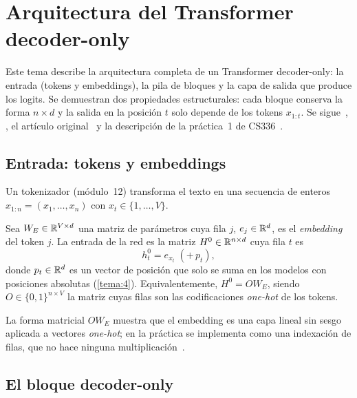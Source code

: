\chapter{Arquitectura del Transformer decoder-only}
\label{tema:1}

Este tema describe la arquitectura completa de un Transformer decoder-only: la entrada (tokens y embeddings), la pila de bloques y la capa de salida que produce los logits. Se demuestran dos propiedades estructurales: cada bloque conserva la forma $n\times d$ y la salida en la posición $t$ solo depende de los tokens $x_{1:t}$. Se sigue~\cite[§7.2--§7.5]{jm3}, \cite[§12.1.7 y §12.3.1]{bishopdl}, el artículo original~\cite[§3]{vaswani} y la descripción de la práctica~1 de CS336~\cite[§3.1 y §3.4]{cs336}.

\section{Entrada: tokens y embeddings}

Un tokenizador (módulo~12) transforma el texto en una secuencia de enteros $x_{1:n}=(x_1,\dots,x_n)$ con $x_t\in\{1,\dots,V\}$.

\begin{definicion}\label{def:embedding}
Sea $W_E\in\mathbb{R}^{V\times d}$ una matriz de parámetros cuya fila $j$, $e_j\in\mathbb{R}^{d}$, es el \emph{embedding} del token $j$. La entrada de la red es la matriz $H^{0}\in\mathbb{R}^{n\times d}$ cuya fila $t$ es
\[
h^{0}_t=e_{x_t}\;(+\,p_t),
\]
donde $p_t\in\mathbb{R}^{d}$ es un vector de posición que solo se suma en los modelos con posiciones absolutas (\cref{tema:4}). Equivalentemente, $H^{0}=OW_E$, siendo $O\in\{0,1\}^{n\times V}$ la matriz cuyas filas son las codificaciones \emph{one-hot} de los tokens.
\end{definicion}

La forma matricial $OW_E$ muestra que el embedding es una capa lineal sin sesgo aplicada a vectores \emph{one-hot}; en la práctica se implementa como una indexación de filas, que no hace ninguna multiplicación~\cite[§7.4]{jm3}.

\section{El bloque decoder-only}

